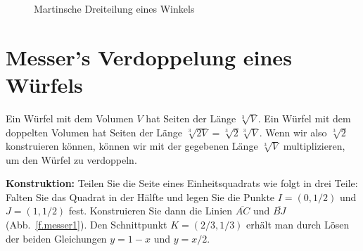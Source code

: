 \begin{figure}[t]
\begin{center}
\end{center}
\caption{Martinsche Dreiteilung eines Winkels}\label{f.martin}
\end{figure}


\section{Messer's Verdoppelung eines Würfels}\label{s.messer}



Ein Würfel mit dem Volumen $V$ hat Seiten der Länge $\sqrt[3]{V}$. Ein Würfel mit dem doppelten Volumen hat Seiten der Länge $\sqrt[3]{2 V}=\sqrt[3]{2}\sqrt[3]{V}$. Wenn wir also $\sqrt[3]{2}$ konstruieren können, können wir mit der gegebenen Länge $\sqrt[3]{V}$ multiplizieren, um den Würfel zu verdoppeln.

\medspace

\noindent{}\textbf{Konstruktion:}
Teilen Sie die Seite eines Einheitsquadrats wie folgt in drei Teile: Falten Sie das Quadrat in der Hälfte und legen Sie die Punkte $I=(0,1/2)$ und $J=(1,1/2)$ fest. Konstruieren Sie dann die Linien $\overline{AC}$ und $\overline{BJ}$ (Abb.~\ref{f.messer1}). Den Schnittpunkt $K=(2/3,1/3)$ erhält man durch Lösen der beiden Gleichungen $y=1-x$ und $y=x/2$.

